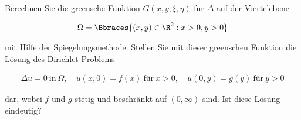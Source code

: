 
\begin{exercise}

Berechnen Sie die greensche Funktion $G(x, y, \xi, \eta)$ für $\Delta$ auf der Viertelebene

\begin{align*}
  \Omega
  =
  \Bbraces{(x, y) \in \R^2: x > 0, y > 0}
\end{align*}

mit Hilfe der Spiegelungsmethode.
  Stellen Sie mit dieser greenschen Funktion die Lösung des Dirichlet-Problems

\begin{align*}
  \Delta u = 0 ~\text{in}~ \Omega,
  \quad
  u(x, 0) = f(x) ~\text{für}~ x > 0,
  \quad
  u(0, y) = g(y) ~\text{für}~ y > 0
\end{align*}

dar, wobei $f$ und $g$ stetig und beschränkt auf $(0, \infty)$ sind. Ist diese Lösung eindeutig?

\end{exercise}



